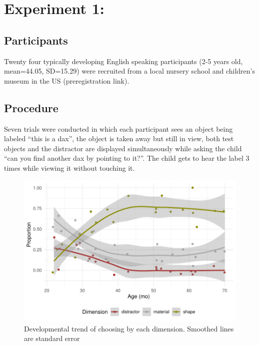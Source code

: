 \documentclass[10pt, letterpaper]{article}
\newenvironment{CodeChunk}{}{}
\begin{document}
\hypertarget{experiment-1}{%
\section{Experiment 1:}\label{experiment-1}}

\hypertarget{participants}{%
\subsection{Participants}\label{participants}}

Twenty four typically developing English speaking participants (2-5
years old, mean=44.05, SD=15.29) were recruited from a local nursery
school and children's museum in the US (preregistration link).

\hypertarget{procedure}{%
\subsection{Procedure}\label{procedure}}

Seven trials were conducted in which each participant sees an object
being labeled ``this is a dax'', the object is taken away but still in
view, both test objects and the distractor are displayed simultaneously
while asking the child ``can you find another dax by pointing to it?''.
The child gets to hear the label 3 times while viewing it without
touching it.

\begin{CodeChunk}
\begin{figure}[tb]
\includegraphics[width=1\linewidth]{figs/first_exp-1} \caption[Developmental trend of choosing by each dimension]{Developmental trend of choosing by each dimension. Smoothed lines are standard error}\label{fig:first_exp}
\end{figure}
\end{CodeChunk}
\end{document}
